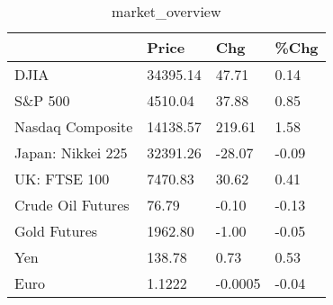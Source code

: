 \documentclass{article}%
\begin{document}
%


\begin{table}[htbp]%
\caption{market\_overview}%
\centering%
\begin{adjustbox}{width=1\textwidth}%
\begin{tabular}{llll}
\toprule
                  &    Price &     Chg &  \%Chg \\
\midrule
             DJIA & 34395.14 &   47.71 &  0.14 \\
          S\&P 500 &  4510.04 &   37.88 &  0.85 \\
 Nasdaq Composite & 14138.57 &  219.61 &  1.58 \\
Japan: Nikkei 225 & 32391.26 &  -28.07 & -0.09 \\
     UK: FTSE 100 &  7470.83 &   30.62 &  0.41 \\
Crude Oil Futures &    76.79 &   -0.10 & -0.13 \\
     Gold Futures &  1962.80 &   -1.00 & -0.05 \\
              Yen &   138.78 &    0.73 &  0.53 \\
             Euro &   1.1222 & -0.0005 & -0.04 \\
\bottomrule
\end{tabular}
%
\end{adjustbox}%
\end{table}

%
\end{document}
